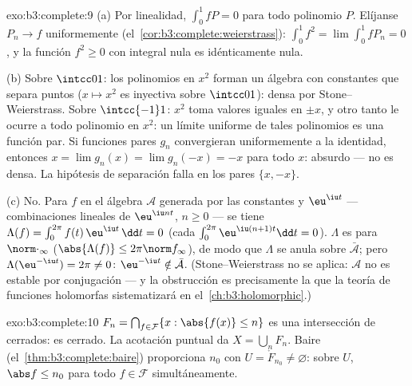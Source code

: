 \begin{solution}{exo:b3:complete:9}
(a) Por linealidad, $\int_0^1 fP = 0$ para todo polinomio $P$. Elíjanse
$P_n \to f$ uniformemente (el~\cref{cor:b3:complete:weierstrass}):
$\int_0^1 f^2 =
\lim\int_0^1 fP_n = 0$, y la función
 $f^2 \geq 0$ con integral
nula es idénticamente nula.

(b) Sobre $\intcc01$: los polinomios en $x^2$ forman un álgebra con
constantes que separa puntos ($x \mapsto x^2$ es inyectiva sobre
$\intcc01$): densa por Stone--Weierstrass. Sobre $\intcc{-1}1$: $x^2$
toma valores iguales en $\pm x$, y otro tanto le ocurre a todo polinomio
en $x^2$: un límite uniforme de tales polinomios es una función par. Si
funciones pares $g_n$ convergieran uniformemente a la identidad,
entonces $x = \lim g_n(x) = \lim g_n(-x) = -x$ para todo $x$: absurdo
--- no es densa. La hipótesis de separación falla en los pares
$\{x, -x\}$.

(c) No. Para $f$ en el álgebra $\mathcal A$ generada por las constantes
y $\eu^{\iu t}$ --- combinaciones lineales de $\eu^{\iu nt}$, $n \geq 0$
--- se tiene $\Lambda(f) =
\int_0^{2\pi}f(t)\,\eu^{\iu t}\,\dd t = 0$ (cada
$\int_0^{2\pi}\eu^{\iu(n+1)t}\dd t = 0$). $\Lambda$ es
 para $\norm\cdot_\infty$
($\abs{\Lambda(f)}\leq
2\pi\norm f_\infty$), de modo que $\Lambda$ se anula sobre
$\bar{\mathcal
A}$; pero $\Lambda(\eu^{-\iu t}) = 2\pi \neq 0$: $\eu^{-\iu t}
\notin \bar{\mathcal A}$. (Stone--Weierstrass no se aplica: $\mathcal A$
no es estable por conjugación --- y la obstrucción es precisamente la
que la teoría de funciones holomorfas sistematizará en
el~\cref{ch:b3:holomorphic}.)
\end{solution}

\begin{solution}{exo:b3:complete:10}
$F_n = \bigcap_{f \in \mathcal F}\{x : \abs{f(x)} \leq n\}$ es una
intersección de cerrados: es cerrado. La acotación puntual da
$X = \bigcup_n F_n$. Baire (el~\cref{thm:b3:complete:baire}) proporciona
$n_0$ con $U = \mathring F_{n_0} \neq \varnothing$: sobre $U$,
$\abs f \leq n_0$ para todo $f \in \mathcal F$ simultáneamente.
\end{solution}

